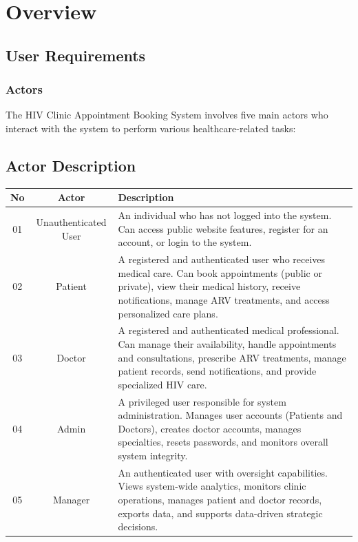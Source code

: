\documentclass[12pt,a4paper]{article}
\begin{document}
\section{Overview}

\subsection{User Requirements}

\subsubsection{Actors}

The HIV Clinic Appointment Booking System involves five main actors who interact with the system to perform various healthcare-related tasks:

\subsection{Actor Description}

\begin{longtable}{|c||c|p{9cm}|}
\hline
\textbf{No} & \textbf{Actor} & \textbf{Description} \\
\hline
01 & Unauthenticated User & An individual who has not logged into the system. Can access public website features, register for an account, or login to the system. \\
\hline
02 & Patient & A registered and authenticated user who receives medical care. Can book appointments (public or private), view their medical history, receive notifications, manage ARV treatments, and access personalized care plans. \\
\hline
03 & Doctor & A registered and authenticated medical professional. Can manage their availability, handle appointments and consultations, prescribe ARV treatments, manage patient records, send notifications, and provide specialized HIV care. \\
\hline
04 & Admin & A privileged user responsible for system administration. Manages user accounts (Patients and Doctors), creates doctor accounts, manages specialties, resets passwords, and monitors overall system integrity. \\
\hline
05 & Manager & An authenticated user with oversight capabilities. Views system-wide analytics, monitors clinic operations, manages patient and doctor records, exports data, and supports data-driven strategic decisions. \\
\hline
\end{longtable}
\end{document}
